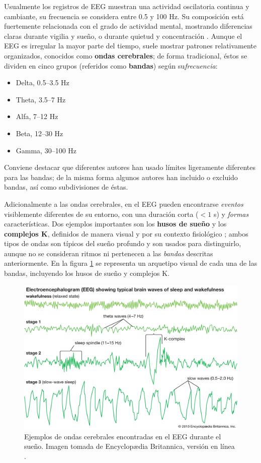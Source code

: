 \documentclass[12pt,letterpaper,draft]{book}
\newcommand{\hz}{\si{\hertz}\xspace}
\begin{document}
Usualmente los registros de EEG muestran una actividad oscilatoria continua y cambiante, su frecuencia se considera entre 0.5 y 100 \hz. 
%
Su composición está fuertemente relacionada con el grado de actividad mental, mostrando diferencias claras durante vigilia y sueño, o durante quietud y concentración \cite{Clark98_2}.
%
Aunque el EEG es irregular la mayor parte del tiempo, suele mostrar patrones relativamente 
organizados, conocidos como \textbf{ondas cerebrales}; de forma tradicional, éstos se dividen en cinco grupos (referidos como \textbf{bandas}) según su\textit{frecuencia}:
\begin{itemize}
\item Delta, 0.5--3.5 \hz
\item Theta, 3.5--7 \hz
\item Alfa, 7--12 \hz
\item Beta, 12--30 \hz
\item Gamma, 30--100 \hz
\end{itemize}

Conviene destacar que diferentes autores han usado límites ligeramente diferentes para las bandas; de la misma forma algunos autores han incluido o excluido bandas, así como subdivisiones de éstas.

Adicionalmente a las ondas cerebrales, en el EEG pueden encontrarse \textit{eventos} visiblemente diferentes de su entorno, con%
%
una duración corta ($<1$ s) y \textit{formas} características.
%
Dos ejemplos importantes son los \textbf{husos de sueño} y los \textbf{complejos K}, definidos de manera visual y por su contexto fisiológico \cite{AASM07}; ambos tipos de ondas son típicos del sueño profundo y son usados para distinguirlo, aunque no se consideran ritmos ni pertenecen a las \textit{bandas} descritas anteriormente.
%
En la figura \ref{ritmos} se representa un arquetipo visual de cada una de las bandas, incluyendo los husos de sueño y complejos K.

\begin{figure}
\centering
\includegraphics[width=0.95\linewidth]{./img_diagramas/ondas_britannica.jpg} 
\caption[Ejemplos de ondas cerebrales encontradas en el EEG]
{Ejemplos de ondas cerebrales encontradas en el EEG durante el sueño. Imagen tomada de Encyclop{\ae}dia Britannica, 
versión en línea \cite{Britannica}.}
\label{ritmos}
\end{figure}
\end{document}
